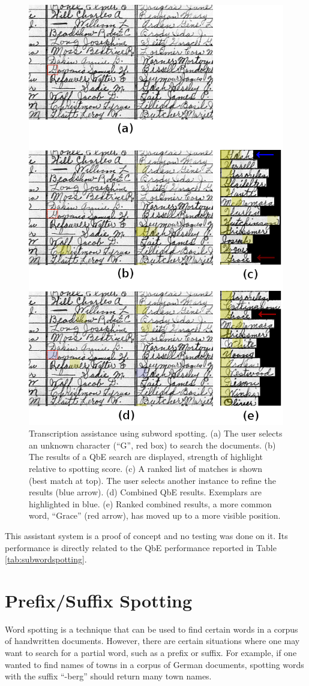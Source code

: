 \documentclass[ms,electronic,twosidetoc,letterpaper,chaptercenter,parttop,lol,lof,lot]{byumsphd}
\begin{document}
\begin{figure}
    \centering
    \includegraphics[width=.65\textwidth]{assist_demo}
    \caption{Transcription assistance using subword spotting. (a) The user selects an unknown character (``G'', red box) to search the documents. (b) The results of a QbE search are displayed, strength of highlight relative to spotting score. (c) A ranked list of matches is shown (best match at top). The user selects another instance to refine the results (blue arrow). (d) Combined QbE results. Exemplars are highlighted in blue. (e) Ranked combined results, a more common word, ``Grace'' (red arrow), has moved up to a more visible position.}
    \label{fig:assist_demo}
\end{figure}

This assistant system is a proof of concept and no testing was done on it. Its performance is directly related to the QbE performance reported in Table \ref{tab:subwordspotting}.


\section{Prefix/Suffix Spotting}
Word spotting is a technique that can be used to find certain words in a corpus of handwritten documents. However, there are certain situations where one may want to search for a partial word, such as a prefix or suffix. For example, if one wanted to find names of towns in a corpus of German documents, spotting words with the suffix ``-berg'' should return many town names.
\end{document}
